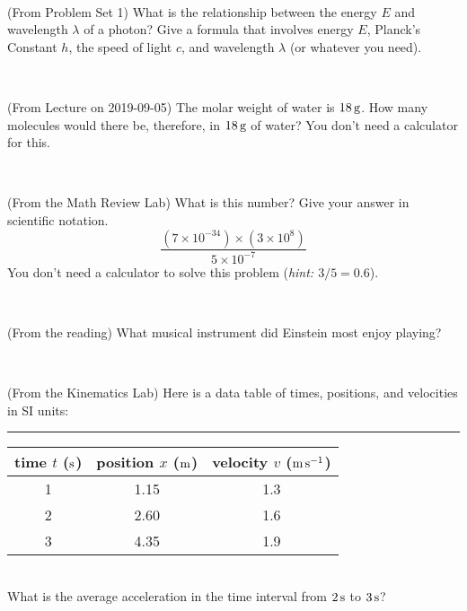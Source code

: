 \documentclass[12pt, letterpaper]{article}
\begin{document}
\vfill ~

\begin{problem} (From Problem Set 1)
What is the relationship between the energy $E$ and wavelength
$\lambda$ of a photon? Give a formula that involves energy $E$,
Planck's Constant $h$, the speed of light $c$, and wavelength
$\lambda$ (or whatever you need).
\end{problem}

\vfill ~


\clearpage


\begin{problem} (From Lecture on 2019-09-05)
The molar weight of water is $18\,\mathrm{g}$. How many molecules would there
be, therefore, in $18\,\mathrm{g}$ of water? You don't need a calculator for
this.
\end{problem}


\vfill ~

\begin{problem} (From the Math Review Lab)
What is this number? Give your answer in scientific notation.
$$
\frac{(7\times10^{-34})\times(3\times10^8)}{5\times10^{-7}}
$$
You don't need a calculator to solve this problem (\textit{hint: $3/5=0.6$}).
\end{problem}


\vfill ~

\begin{problem} (From the reading)
What musical instrument did Einstein most enjoy playing?
\end{problem}


\vfill ~

\begin{problem} (From the Kinematics Lab)
Here is a data table of times, positions, and velocities in SI units:\\
\rule{1.0in}{0pt}\begin{tabular}{c|c|c}
time $t$ ($\mathrm{s}$) & position $x$ ($\mathrm{m}$) & velocity $v$ ($\mathrm{m}\,\mathrm{s}^{-1}$) \\
\hline
1 & 1.15 & 1.3 \\
2 & 2.60 & 1.6 \\
3 & 4.35 & 1.9 \\
\hline
\end{tabular}\\
What is the average acceleration in the time interval from $2\,\mathrm{s}$ to $3\,\mathrm{s}$?
\end{problem}


\vfill ~


\cleardoublepage
\end{document}

